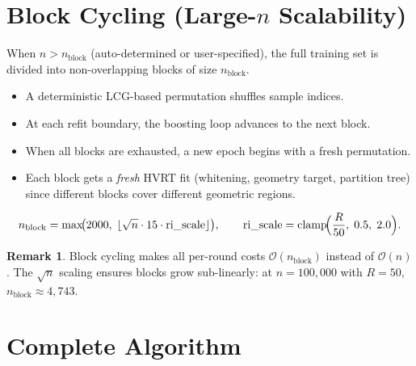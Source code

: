 \documentclass[11pt,a4paper]{article}
\theoremstyle{definition}
\newtheorem{remark}{Remark}
\begin{document}
\section{Block Cycling (Large-$n$ Scalability)}

When $n > n_{\text{block}}$ (auto-determined or user-specified), the full
training set is divided into non-overlapping blocks of size $n_{\text{block}}$.

\begin{itemize}[nosep]
    \item A deterministic LCG-based permutation shuffles sample indices.
    \item At each refit boundary, the boosting loop advances to the next block.
    \item When all blocks are exhausted, a new epoch begins with a fresh
        permutation.
    \item Each block gets a \emph{fresh} HVRT fit (whitening, geometry target,
        partition tree) since different blocks cover different geometric regions.
\end{itemize}

\begin{equation}
    n_{\text{block}} = \max\!\bigl(2000,\; \lfloor\sqrt{n} \cdot 15 \cdot \text{ri\_scale}\rfloor\bigr),
    \qquad
    \text{ri\_scale} = \text{clamp}\!\Bigl(\frac{R}{50},\; 0.5,\; 2.0\Bigr).
\end{equation}

\begin{remark}
Block cycling makes all per-round costs $\mathcal{O}(n_{\text{block}})$
instead of $\mathcal{O}(n)$.  The $\sqrt{n}$ scaling ensures blocks grow
sub-linearly: at $n = 100{,}000$ with $R = 50$, $n_{\text{block}} \approx 4{,}743$.
\end{remark}


\section{Complete Algorithm}
\end{document}
